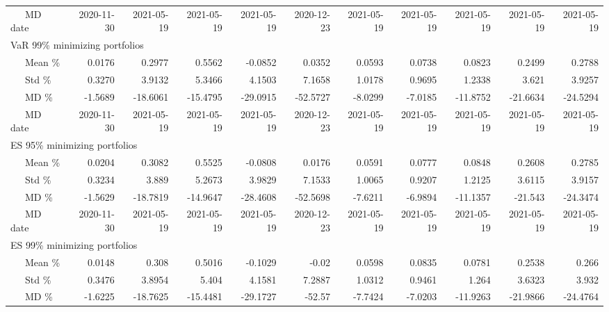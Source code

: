 \begin{table}[!]
{\begin{tabular}{l*{10}{r}}
\ \ \ MD date &  2020-11-30 &  2021-05-19 &  2021-05-19 &  2021-05-19 &  2020-12-23 &  2021-05-19 &  2021-05-19 &  2021-05-19 &  2021-05-19 &  2021-05-19 \\
  \multicolumn{10}{l}{VaR 99\% minimizing portfolios}   \\
\ \ \ Mean \%  &      0.0176 &      0.2977 &      0.5562 &     -0.0852 &      0.0352 &      0.0593 &      0.0738 &      0.0823 &      0.2499 &      0.2788 \\
\ \ \ Std \%   &      0.3270 &      3.9132 &      5.3466 &      4.1503 &      7.1658 &      1.0178 &      0.9695 &      1.2338 &       3.621 &      3.9257 \\
\ \ \ MD \%    &     -1.5689 &    -18.6061 &    -15.4795 &    -29.0915 &    -52.5727 &     -8.0299 &     -7.0185 &    -11.8752 &    -21.6634 &    -24.5294 \\
\ \ \ MD date &  2020-11-30 &  2021-05-19 &  2021-05-19 &  2021-05-19 &  2020-12-23 &  2021-05-19 &  2021-05-19 &  2021-05-19 &  2021-05-19 &  2021-05-19 \\
  \multicolumn{10}{l}{ES 95\% minimizing portfolios}   \\
\ \ \ Mean \%  &      0.0204 &      0.3082 &      0.5525 &     -0.0808 &      0.0176 &      0.0591 &      0.0777 &      0.0848 &      0.2608 &      0.2785 \\
\ \ \ Std \%   &      0.3234 &       3.889 &      5.2673 &      3.9829 &      7.1533 &      1.0065 &      0.9207 &      1.2125 &      3.6115 &      3.9157 \\
\ \ \ MD \%    &     -1.5629 &    -18.7819 &    -14.9647 &    -28.4608 &    -52.5698 &     -7.6211 &     -6.9894 &    -11.1357 &     -21.543 &    -24.3474 \\
\ \ \ MD date &  2020-11-30 &  2021-05-19 &  2021-05-19 &  2021-05-19 &  2020-12-23 &  2021-05-19 &  2021-05-19 &  2021-05-19 &  2021-05-19 &  2021-05-19 \\
  \multicolumn{10}{l}{ES 99\% minimizing portfolios}   \\
\ \ \ Mean \%  &      0.0148 &       0.308 &      0.5016 &     -0.1029 &       -0.02 &      0.0598 &      0.0835 &      0.0781 &      0.2538 &       0.266 \\
\ \ \ Std \%   &      0.3476 &      3.8954 &       5.404 &      4.1581 &      7.2887 &      1.0312 &      0.9461 &       1.264 &      3.6323 &       3.932 \\
\ \ \ MD \%    &     -1.6225 &    -18.7625 &    -15.4481 &    -29.1727 &      -52.57 &     -7.7424 &     -7.0203 &    -11.9263 &    -21.9866 &    -24.4764 \\

\end{tabular}}
\end{table}
